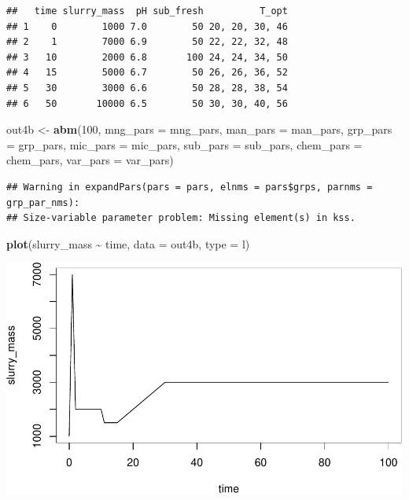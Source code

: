 \documentclass[
]{article}
\newenvironment{Shaded}{\begin{snugshade}}{\end{snugshade}}
\newcommand{\AttributeTok}[1]{\textcolor[rgb]{0.13,0.29,0.53}{#1}}
\newcommand{\DecValTok}[1]{\textcolor[rgb]{0.00,0.00,0.81}{#1}}
\newcommand{\FunctionTok}[1]{\textcolor[rgb]{0.13,0.29,0.53}{\textbf{#1}}}
\newcommand{\NormalTok}[1]{#1}
\newcommand{\OtherTok}[1]{\textcolor[rgb]{0.56,0.35,0.01}{#1}}
\newcommand{\SpecialCharTok}[1]{\textcolor[rgb]{0.81,0.36,0.00}{\textbf{#1}}}
\newcommand{\StringTok}[1]{\textcolor[rgb]{0.31,0.60,0.02}{#1}}
\begin{document}
\begin{verbatim}
##   time slurry_mass  pH sub_fresh          T_opt
## 1    0        1000 7.0        50 20, 20, 30, 46
## 2    1        7000 6.9        50 22, 22, 32, 48
## 3   10        2000 6.8       100 24, 24, 34, 50
## 4   15        5000 6.7        50 26, 26, 36, 52
## 5   30        3000 6.6        50 28, 28, 38, 54
## 6   50       10000 6.5        50 30, 30, 40, 56
\end{verbatim}

\begin{Shaded}
\begin{Highlighting}[]
\NormalTok{out4b }\OtherTok{\textless{}{-}} \FunctionTok{abm}\NormalTok{(}\DecValTok{100}\NormalTok{,}
             \AttributeTok{mng\_pars =}\NormalTok{ mng\_pars,}
             \AttributeTok{man\_pars =}\NormalTok{ man\_pars,}
             \AttributeTok{grp\_pars =}\NormalTok{ grp\_pars,}
             \AttributeTok{mic\_pars =}\NormalTok{ mic\_pars,}
             \AttributeTok{sub\_pars =}\NormalTok{ sub\_pars,}
             \AttributeTok{chem\_pars =}\NormalTok{ chem\_pars,}
             \AttributeTok{var\_pars =}\NormalTok{ var\_pars)}
\end{Highlighting}
\end{Shaded}

\begin{verbatim}
## Warning in expandPars(pars = pars, elnms = pars$grps, parnms = grp_par_nms):
## Size-variable parameter problem: Missing element(s) in kss.
\end{verbatim}

\begin{Shaded}
\begin{Highlighting}[]
\FunctionTok{plot}\NormalTok{(slurry\_mass }\SpecialCharTok{\textasciitilde{}}\NormalTok{ time, }\AttributeTok{data =}\NormalTok{ out4b, }\AttributeTok{type =} \StringTok{\textquotesingle{}l\textquotesingle{}}\NormalTok{)}
\end{Highlighting}
\end{Shaded}

\includegraphics{simple_demo_files/figure-latex/unnamed-chunk-30-1.pdf}
\end{document}
